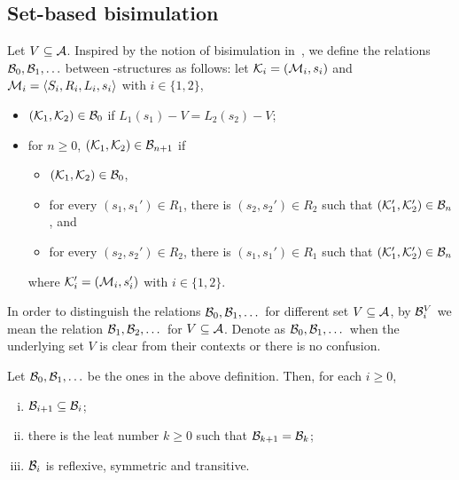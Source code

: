 \documentclass{article}
\begin{document}
\subsection{Set-based bisimulation}
Let $V\subseteq\cal A$. Inspired by the notion of bisimulation in~\cite{DBLP:journals/tcs/BrowneCG88}, we define the relations ${\cal B}_0,{\cal B}_1,\ldots$
between \MPK-structures as follows: let
${\cal K}_i=({\cal M}_i,s_i)$ and ${\cal M}_i={\langle{S_i, R_i,L_i, s_i}\rangle}$ with $i\in\{1,2\}$,
\begin{itemize}
  \item $({\cal K}_1,{\cal K}_2)\in{\cal B}_0$ if $L_1(s_1)-V=L_2(s_2)-V$;  %
  \item for $n\ge 0$, $({\cal K}_1,{\cal K}_2)\in{\cal B}_{n+1}$ if
  \begin{itemize}
    \item $({\cal K}_1,{\cal K}_2)\in{\cal B}_0$,
    \item for every $(s_1,s_1')\in R_1$, there is $(s_2,s_2')\in R_2$
    such that $({\cal K}_1',{\cal K}_2')\in {\cal B}_n$, and
    \item for every $(s_2,s_2')\in R_2$, there is $(s_1,s_1')\in R_1$
    such that $({\cal K}_1',{\cal K}_2')\in {\cal B}_n$
  \end{itemize}
  where ${\cal K}_i'=({\cal M}_i,s_i')$ with $i\in\{1,2\}$.
\end{itemize}

In order to distinguish the relations ${\cal B}_0, {\cal B}_1, \dots$ for different set $V \subseteq {\cal A}$, by ${\cal B}_i^V$ we mean the relation ${\cal B}_1, {\cal B}_2, \dots$ for $V \subseteq {\cal A}$.
Denote as ${\cal B}_0, {\cal B}_1, \dots$ when the underlying set $V$ is clear from their contexts or there is no confusion.

\begin{lemma}\label{lem:B:relations}
  Let  ${\cal B}_0, {\cal B}_1,\ldots$ be the ones in the above definition.
   Then,  for each $i\ge 0$,
   \begin{enumerate}[(i)]
     \item ${\cal B}_{i+1}\subseteq {\cal B}_i$;
     \item there is the leat number $k\ge 0$ such that ${\cal B}_{k+1}={\cal B}_k$;
     \item ${\cal B}_i$ is reflexive, symmetric and transitive.
   \end{enumerate}
\end{lemma}
\end{document}
